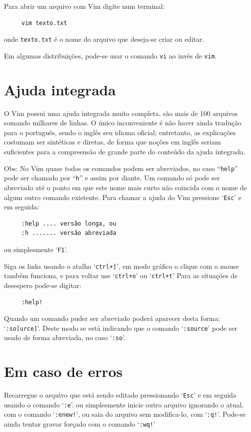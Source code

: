 Para abrir um arquivo com Vim digite num terminal:
%
\begin{verbatim}
     vim texto.txt
\end{verbatim}
onde {\tt texto.txt} é o nome do arquivo que deseja-se criar ou editar.

Em algumas distribuições, pode-se usar o comando {\tt vi} ao invés de {\tt vim}.

\section{Ajuda integrada}
%
O Vim possui uma ajuda integrada muito completa, são mais
de 100 arquivos somando milhares de linhas. O único inconveniente é não haver ainda
tradução para o português, sendo o inglês seu idioma oficial; entretanto, as explicações
costumam ser sintéticas e diretas, de forma que noções em inglês seriam
suficientes para a compreensão de grande parte do conteúdo da ajuda integrada.

Obs: No Vim quase todos os comandos podem ser abreviados, no caso
``\verb+help+'' pode ser chamado por ``\verb+h+'' e assim por diante. Um
comando só pode ser abreviado até o ponto em que este nome mais curto não
coincida com o nome de algum outro comando existente.  Para chamar a ajuda do
Vim pressione `\texttt{Esc}' e em seguida:
%
\begin{verbatim}
     :help .... versão longa, ou
     :h ....... versão abreviada
\end{verbatim}
%
ou simplesmente `\texttt{F1}'.

Siga os links usando o atalho `\verb|ctrl+]|', em modo gráfico o clique com o
mouse também funciona, e para voltar use `\verb|ctrl+o|' ou
`\verb|ctrl+t|' Para as situações de desespero pode-se digitar:

\begin{verbatim}
     :help!
\end{verbatim}

{\Large {}} Quando um comando puder ser abreviado poderá aparecer
desta forma: `\texttt{:so[urce]}'. Deste modo se está indicando que o comando 
`\texttt{:source}' pode ser usado de forma abreviada, no caso `\texttt{:so}'.

\section{Em caso de erros }\label{Em caso de erros }
%
Recarregue o arquivo que está sendo editado pressionando
`\verb|Esc|' e em seguida usando o comando `\texttt{:e}'.
ou simplesmente inicie outro arquivo ignorando o atual, com o comando `\texttt{:enew!}',
ou saia do arquivo sem modifica-lo, com `\texttt{:q!}'. Pode-se ainda tentar gravar
forçado com o comando `\texttt{:wq!}'


